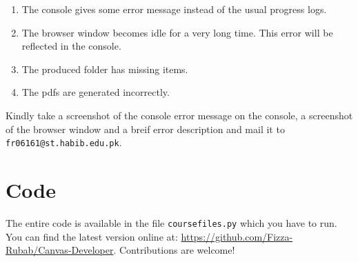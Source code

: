 \documentclass{article}
\begin{document}
\begin{enumerate}
\def\labelenumi{\arabic{enumi}.}
\item
  The console gives some error message instead of the usual progress
  logs.
\item
  The browser window becomes idle for a very long time. This error will
  be reflected in the console.
\item
  The produced folder has missing items.
\item
  The pdfs are generated incorrectly.
\end{enumerate}

Kindly take a screenshot of the console error message on the console, a
screenshot of the browser window and a breif error description and mail
it to \texttt{fr06161@st.habib.edu.pk}.

\section{Code}

The entire code is available in the file \texttt{coursefiles.py} which
you have to run. You can find the latest version online at:
\url{https://github.com/Fizza-Rubab/Canvas-Developer}. Contributions are
welcome!
\end{document}
